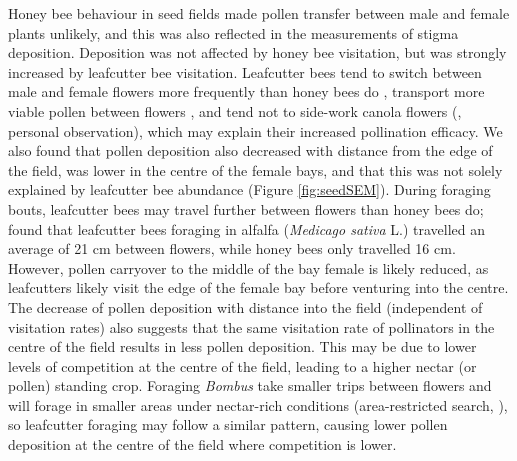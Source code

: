 \documentclass[12pt]{article} %
\begin{document}
Honey bee behaviour in seed fields made pollen transfer between male and female plants unlikely, and this was also reflected in the measurements of stigma deposition. 
Deposition was not affected by honey bee visitation, but was strongly increased by leafcutter bee visitation.
Leafcutter bees tend to switch between male and female flowers more frequently than honey bees do \citep{waytesMsc}, transport more viable pollen between flowers \citep{parker2015}, and tend not to side-work canola flowers (\citealp{soroka2001}, personal observation), which may explain their increased pollination efficacy.
We also found that pollen deposition also decreased with distance from the edge of the field, was lower in the centre of the female bays, and that this was not solely explained by leafcutter bee abundance (Figure \ref{fig:seedSEM}).
During foraging bouts, leafcutter bees may travel further between flowers than honey bees do; \citet{brunet2019} found that leafcutter bees foraging in alfalfa (\emph{Medicago sativa} L.) travelled an average of 21 cm between flowers, while honey bees only travelled 16 cm.
However, pollen carryover \citep{thomson1986} to the middle of the bay female is likely reduced, as leafcutters likely visit the edge of the female bay before venturing into the centre.
The decrease of pollen deposition with distance into the field (independent of visitation rates) also suggests that the same visitation rate of pollinators in the centre of the field results in less pollen deposition.
This may be due to lower levels of competition at the centre of the field, leading to a higher nectar (or pollen) standing crop. %
Foraging \textit{Bombus} take smaller trips between flowers and will forage in smaller areas under nectar-rich conditions (area-restricted search, \citealp{pyke1978b, heinrich1979}), so leafcutter foraging may follow a similar pattern, causing lower pollen deposition at the centre of the field where competition is lower.
\end{document}
